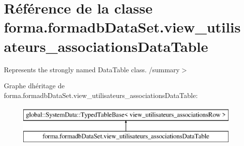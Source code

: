 \hypertarget{classforma_1_1formadb_data_set_1_1view__utilisateurs__associations_data_table}{}\section{Référence de la classe forma.\+formadb\+Data\+Set.\+view\+\_\+utilisateurs\+\_\+associations\+Data\+Table}
\label{classforma_1_1formadb_data_set_1_1view__utilisateurs__associations_data_table}


Represents the strongly named Data\+Table class. /summary$>$  


Graphe d\textquotesingle{}héritage de forma.\+formadb\+Data\+Set.\+view\+\_\+utilisateurs\+\_\+associations\+Data\+Table\+:\begin{figure}[H]
\begin{center}
\leavevmode
\includegraphics[height=2.000000cm]{classforma_1_1formadb_data_set_1_1view__utilisateurs__associations_data_table}
\end{center}
\end{figure}
